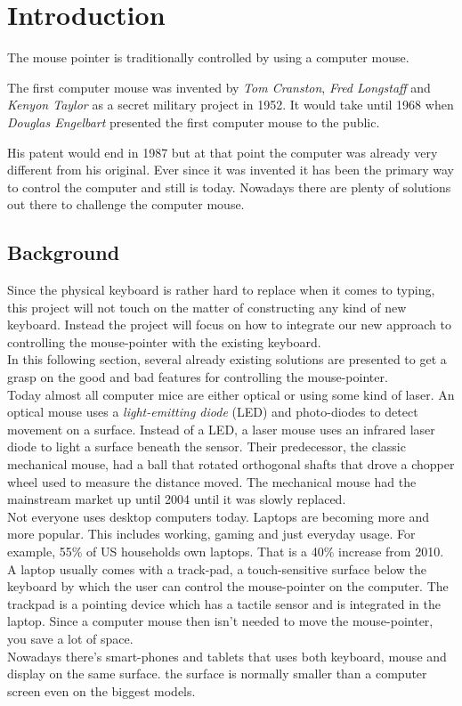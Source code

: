 \chapter{Introduction}
The mouse pointer is traditionally controlled by using a computer mouse.

The first computer mouse was invented by \emph{Tom Cranston}, \emph{Fred Longstaff} and 
\emph{Kenyon Taylor} as a secret military project in 1952. It would take until 
1968 when \emph{Douglas Engelbart} presented the first computer mouse to the public.

His patent would end in 1987 but at that point the  computer was already very different from his original. Ever since
it was invented it has been the primary way to control the computer and still is today. Nowadays
there are plenty of solutions out there to challenge the computer mouse.\cite{Mouse40} \cite{Pioneers}

\section{Background}
Since the physical keyboard is rather hard to replace when it comes to typing, this project
will not touch on the matter of constructing any kind of new keyboard. Instead the project
will focus on how to integrate our new approach to controlling the mouse-pointer with the existing
keyboard.\\
In this following section, several already existing solutions are presented to get a grasp
on the good and bad features for controlling the mouse-pointer.\\
Today almost all computer mice are either optical or using some kind of laser. An optical
mouse uses a \emph{light-emitting diode} (LED) and photo-diodes to detect movement on a
surface. Instead of a LED, a laser mouse uses an infrared laser diode to light a surface
beneath the sensor. Their predecessor, the classic mechanical mouse, had a ball that rotated
orthogonal shafts that drove a chopper wheel used to measure the distance moved. The mechanical
mouse had the mainstream market up until 2004 until it was slowly replaced.\\
Not everyone uses desktop computers today. Laptops are becoming more and more popular.
This includes working, gaming and just everyday usage. For example, 55\% of US households
own laptops. That is a 40\% increase from 2010.\\
A laptop usually comes with a track-pad, a touch-sensitive surface below the keyboard
by which the user can control the mouse-pointer on the computer.
The trackpad is a pointing device which has a tactile sensor and is
integrated in the laptop. Since a computer mouse then isn't needed to move
the mouse-pointer, you save a lot of space.\\
Nowadays there's smart-phones and tablets that uses both keyboard, mouse
and display on the same surface. the surface is normally smaller than a computer screen
even on the biggest models.

